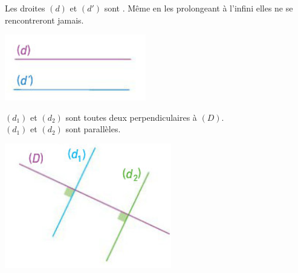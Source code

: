\documentclass[12pt,a4paper]{article}
\begin{document}
\begin{myex}
	\begin{multicols}{2}
		Les droites $(d)$ et $(d')$ sont \hspace*{5cm}. Même en les prolongeant à l'infini elles ne se rencontreront jamais.
		
		\includegraphics[scale=0.6]{img/para1}
	\end{multicols}
	
\end{myex}




\begin{myex}
	\begin{multicols}{2}
		 $(d_1)$ et $(d_2)$ sont toutes deux perpendiculaires à $(D)$.\\
		 $(d_1)$ et $(d_2)$ sont parallèles.
		
		\includegraphics[scale=0.6]{img/para2}
	\end{multicols}
	
\end{myex}
\end{document}
